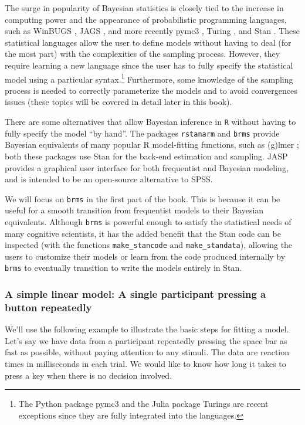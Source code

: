 \documentclass[12pt,]{krantz}
\theoremstyle{definition}
\theoremstyle{definition}
\theoremstyle{definition}
\theoremstyle{remark}
\begin{document}
The surge in popularity of Bayesian statistics is closely tied to the increase in computing power and the appearance of probabilistic programming languages, such as WinBUGS \citep{lunn2000winbugs}, JAGS \citep{plummer2016jags}, and more recently pymc3 \citep{Salvatier2016}, Turing \citep{turing}, and Stan \citep{carpenter2017stan}. These statistical languages allow the user to define models without having to deal (for the most part) with the complexities of the sampling process. However, they require learning a new language since the user has to fully specify the statistical model using a particular syntax.\footnote{The Python package pymc3 and the Julia package Turings are recent exceptions since they are fully integrated into the languages.} Furthermore, some knowledge of the sampling process is needed to correctly parameterize the models and to avoid convergences issues (these topics will be covered in detail later in this book).

There are some alternatives that allow Bayesian inference in \texttt{R} without having to fully specify the model ``by hand''. The packages \texttt{rstanarm} \citep{rstanarm} and \texttt{brms} \citep{R-brms} provide Bayesian equivalents of many popular R model-fitting functions, such as (g)lmer \citep{lme4new}; both these packages use Stan for the back-end estimation and sampling. JASP \citep{JASP2019} provides a graphical user interface for both frequentist and Bayesian modeling, and is intended to be an open-source alternative to SPSS.

We will focus on \texttt{brms} in the first part of the book. This is because it can be useful for a smooth transition from frequentist models to their Bayesian equivalents. Although \texttt{brms} is powerful enough to satisfy the statistical needs of many cognitive scientists, it has the added benefit that the Stan code can be inspected (with the functions \texttt{make\_stancode} and \texttt{make\_standata}), allowing the users to customize their models or learn from the code produced internally by \texttt{brms} to eventually transition to write the models entirely in Stan.

\hypertarget{sec:simplenormal}{%
\subsubsection{A simple linear model: A single participant pressing a button repeatedly}\label{sec:simplenormal}}

We'll use the following example to illustrate the basic steps for fitting a model. Let's say we have data from a participant repeatedly pressing the space bar as fast as possible, without paying attention to any stimuli. The data are reaction times in milliseconds in each trial. We would like to know how long it takes to press a key when there is no decision involved.
\end{document}
